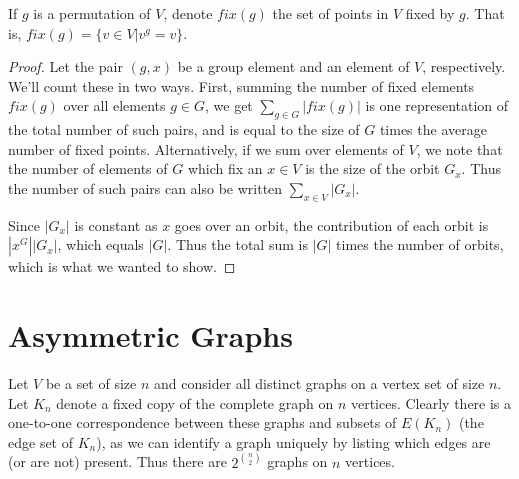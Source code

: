 If $g$ is a permutation of $V$, denote $fix(g)$ the set of points in $V$ fixed by $g$.  That is, $fix(g)=\{v\in V | v^g=v\}$.


\begin{proof}
	
	Let the pair $(g,x)$ be a group element and an element of $V$, respectively.  We'll count these in two ways.  First, summing the number of fixed elements $fix(g)$ over all elements $g\in G$, we get $\sum\limits_{g\in G}|fix(g)|$ is one representation of the total number of such pairs, and is equal to the size of $G$ times the average number of fixed points.  Alternatively, if we sum over elements of $V$, we note that the number of elements of $G$ which fix an $x\in V$ is the size of the orbit $G_x$.  Thus the number of such pairs can also be written $\sum\limits_{x\in V}|G_x|$.
	
	Since $|G_x|$ is constant as $x$ goes over an orbit, the contribution of each orbit is $|x^G||G_x|$, which equals $|G|$.  Thus the total sum is $|G|$ times the number of orbits, which is what we wanted to show.
	
	
\end{proof}






\section*{Asymmetric Graphs}













Let $V$ be a set of size $n$ and consider all distinct graphs on a vertex set of size $n$.  Let $K_n$ denote a fixed copy of the complete graph on $n$ vertices.  Clearly there is a one-to-one correspondence between these graphs and subsets of $E(K_n)$ (the edge set of $K_n$), as we can identify a graph uniquely by listing which edges are (or are not) present.  Thus there are $2^{\binom{n}{2}}$ graphs on $n$ vertices.

